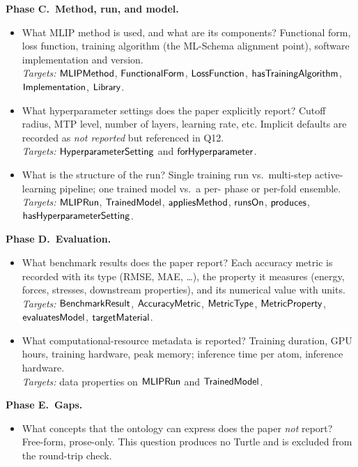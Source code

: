 \smallskip
\noindent\textbf{Phase C.\ Method, run, and model.}
\begin{itemize}
\item[Q7.] What MLIP method is used, and what are its components?
  Functional form, loss function, training algorithm (the ML-Schema
  alignment point), software implementation and version.
  \\ \emph{Targets:} $\mathsf{MLIPMethod}$,
  $\mathsf{FunctionalForm}$, $\mathsf{LossFunction}$,
  $\mathsf{hasTrainingAlgorithm}$, $\mathsf{Implementation}$, $\mathsf{Library}$.
\item[Q8.] What hyperparameter settings does the paper explicitly
  report? Cutoff radius, MTP level, number of layers, learning rate,
  etc. Implicit defaults are recorded as
  \emph{not reported} but referenced in Q12.
  \\ \emph{Targets:} $\mathsf{HyperparameterSetting}$ and
  $\mathsf{forHyperparameter}$.
\item[Q9.] What is the structure of the run? Single training run vs.\
  multi-step active-learning pipeline; one trained model vs.\ a per-
  phase or per-fold ensemble.
  \\ \emph{Targets:} $\mathsf{MLIPRun}$, $\mathsf{TrainedModel}$,
  $\mathsf{appliesMethod}$, $\mathsf{runsOn}$, $\mathsf{produces}$,
  $\mathsf{hasHyperparameterSetting}$.
\end{itemize}

\smallskip
\noindent\textbf{Phase D.\ Evaluation.}
\begin{itemize}
\item[Q10.] What benchmark results does the paper report? Each
  accuracy metric is recorded with its type (RMSE, MAE, \dots), the
  property it measures (energy, forces, stresses, downstream
  properties), and its numerical value with units.
  \\ \emph{Targets:} $\mathsf{BenchmarkResult}$, $\mathsf{AccuracyMetric}$,
  $\mathsf{MetricType}$, $\mathsf{MetricProperty}$, $\mathsf{evaluatesModel}$,
  $\mathsf{targetMaterial}$.
\item[Q11.] What computational-resource metadata is reported?
  Training duration, GPU hours, training hardware, peak memory;
  inference time per atom, inference hardware.
  \\ \emph{Targets:} data properties on $\mathsf{MLIPRun}$ and
  $\mathsf{TrainedModel}$.
\end{itemize}

\smallskip
\noindent\textbf{Phase E.\ Gaps.}
\begin{itemize}
\item[Q12.] What concepts that the ontology can express does the
  paper \emph{not} report? Free-form, prose-only. This question
  produces no Turtle and is excluded from the round-trip check.
\end{itemize}

